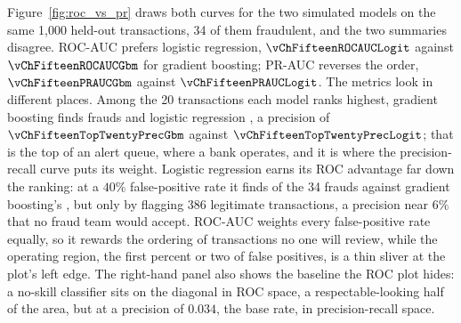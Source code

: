 \documentclass[../ai_in_finance]{subfiles}
\begin{document}
Figure~\ref{fig:roc_vs_pr} draws both curves for the two simulated models on the same 1,000 held-out transactions, 34 of them fraudulent, and the two summaries disagree. ROC-AUC prefers logistic regression, $\vChFifteenROCAUCLogit$ against $\vChFifteenROCAUCGbm$ for gradient boosting; PR-AUC reverses the order, $\vChFifteenPRAUCGbm$ against $\vChFifteenPRAUCLogit$. The metrics look in different places. Among the 20 transactions each model ranks highest, gradient boosting finds \vChFifteenTopTwentyGbm{} frauds and logistic regression \vChFifteenTopTwentyLogit, a precision of $\vChFifteenTopTwentyPrecGbm$ against $\vChFifteenTopTwentyPrecLogit$; that is the top of an alert queue, where a bank operates, and it is where the precision-recall curve puts its weight. Logistic regression earns its ROC advantage far down the ranking: at a $40\%$ false-positive rate it finds \vChFifteenFraudsAtFortyLogit{} of the 34 frauds against gradient boosting's \vChFifteenFraudsAtFortyGbm, but only by flagging 386 legitimate transactions, a precision near $6\%$ that no fraud team would accept. ROC-AUC weights every false-positive rate equally, so it rewards the ordering of transactions no one will review, while the operating region, the first percent or two of false positives, is a thin sliver at the plot's left edge. The right-hand panel also shows the baseline the ROC plot hides: a no-skill classifier sits on the diagonal in ROC space, a respectable-looking half of the area, but at a precision of $0.034$, the base rate, in precision-recall space.
\end{document}
